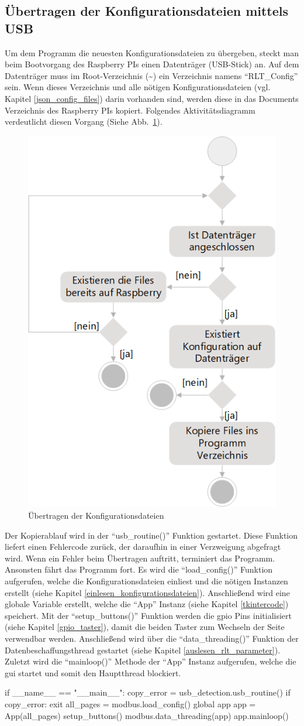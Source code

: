 \subsection{Übertragen der Konfigurationsdateien mittels USB}
Um dem Programm die neuesten Konfigurationsdateien zu übergeben, steckt man beim Bootvorgang des Raspberry PIs einen Datenträger (\zB USB-Stick) an. Auf dem Datenträger muss im Root-Verzeichnis (\textasciitilde) ein Verzeichnis namens \enquote{RLT\_Config} sein. Wenn dieses Verzeichnis und alle nötigen Konfigurationsdateien (vgl. Kapitel \ref{json_config_files}) darin vorhanden sind, werden diese in das Documents Verzeichnis des Raspberry PIs kopiert. Folgendes Aktivitätsdiagramm verdeutlicht diesen Vorgang (Siehe Abb.~\ref{fig:config_ubertragen_activity}).
\begin{figure}[H]
	\centering
	\includegraphics[width=0.4\linewidth]{Bilder/config_ubertragen_activity_diagram}
	\caption{Übertragen der Konfigurationsdateien}
	\label{fig:config_ubertragen_activity}
\end{figure}

Der Kopierablauf wird in der \enquote{usb\_routine()} Funktion gestartet. Diese Funktion liefert einen Fehlercode zurück, der daraufhin in einer Verzweigung abgefragt wird. Wenn ein Fehler beim Übertragen auftritt, terminiert das Programm. Ansonsten fährt das Programm fort. Es wird die \enquote{load\_config()} Funktion aufgerufen, welche die Konfigurationsdateien einliest und die nötigen Instanzen erstellt (siehe Kapitel \ref{einlesen_konfigurationsdateien}). Anschließend wird eine globale Variable erstellt, welche die \enquote{App} Instanz (siehe Kapitel \ref{tkintercode}) speichert. Mit der \enquote{setup\_buttons()} Funktion werden die \acs{gpio} Pins initialisiert (siehe Kapitel \ref{gpio_taster}), damit die beiden Taster zum Wechseln der Seite verwendbar werden. Anschließend wird über die \enquote{data\_threading()} Funktion der Datenbeschaffungsthread gestartet (siehe Kapitel  \ref{auslesen_rlt_parameter}). Zuletzt wird die \enquote{mainloop()} Methode der \enquote{App} Instanz aufgerufen, welche die \acs{gui} startet und somit den Hauptthread blockiert.
\begin{pythoncode}
if __name__ == "__main__":
	copy_error = usb_detection.usb_routine()
	if copy_error:
		exit
	all_pages = modbus.load_config()
	global app
	app = App(all_pages)
	setup_buttons()
	modbus.data_threading(app)
	app.mainloop()	
\end{pythoncode}

